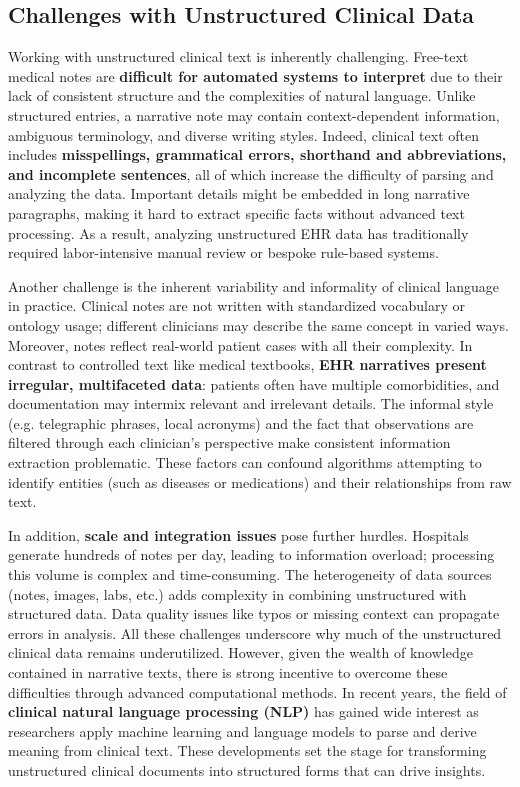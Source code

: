 \subsection{Challenges with Unstructured Clinical Data}

Working with unstructured clinical text is inherently challenging. Free-text medical notes are \textbf{difficult for automated systems to interpret} due to their lack of consistent structure and the complexities of natural language. Unlike structured entries, a narrative note may contain context-dependent information, ambiguous terminology, and diverse writing styles. Indeed, clinical text often includes \textbf{misspellings, grammatical errors, shorthand and abbreviations, and incomplete sentences}, all of which increase the difficulty of parsing and analyzing the data. Important details might be embedded in long narrative paragraphs, making it hard to extract specific facts without advanced text processing. As a result, analyzing unstructured EHR data has traditionally required labor-intensive manual review or bespoke rule-based systems.

Another challenge is the inherent variability and informality of clinical language in practice. Clinical notes are not written with standardized vocabulary or ontology usage; different clinicians may describe the same concept in varied ways. Moreover, notes reflect real-world patient cases with all their complexity. In contrast to controlled text like medical textbooks, \textbf{EHR narratives present irregular, multifaceted data}: patients often have multiple comorbidities, and documentation may intermix relevant and irrelevant details. The informal style (e.g. telegraphic phrases, local acronyms) and the fact that observations are filtered through each clinician's perspective make consistent information extraction problematic. These factors can confound algorithms attempting to identify entities (such as diseases or medications) and their relationships from raw text.

In addition, \textbf{scale and integration issues} pose further hurdles. Hospitals generate hundreds of notes per day, leading to information overload; processing this volume is complex and time-consuming. The heterogeneity of data sources (notes, images, labs, etc.) adds complexity in combining unstructured with structured data. Data quality issues like typos or missing context can propagate errors in analysis. All these challenges underscore why much of the unstructured clinical data remains underutilized. However, given the wealth of knowledge contained in narrative texts, there is strong incentive to overcome these difficulties through advanced computational methods. In recent years, the field of \textbf{clinical natural language processing (NLP)} has gained wide interest as researchers apply machine learning and language models to parse and derive meaning from clinical text. These developments set the stage for transforming unstructured clinical documents into structured forms that can drive insights.

